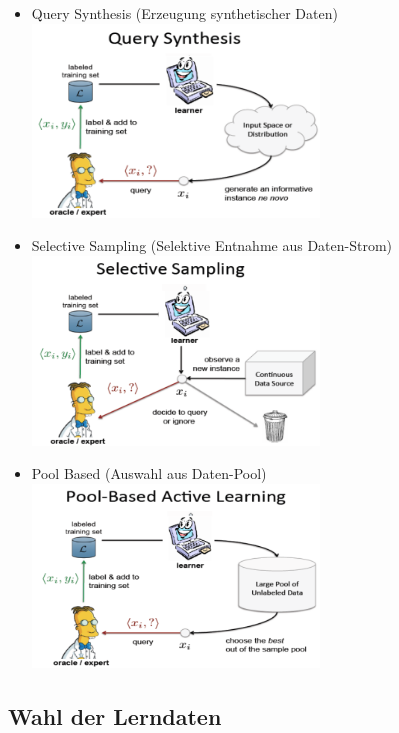 \documentclass[paper=a4, fontsize=11pt]{scrartcl} %
\numberwithin{equation}{section} %
\numberwithin{figure}{section} %
\numberwithin{table}{section} %
\begin{document}
\begin{itemize}
\item Query Synthesis (Erzeugung synthetischer Daten) \\ \includegraphics[width=0.6\textwidth]{imgs/qsyn}
\item Selective Sampling (Selektive Entnahme aus Daten-Strom) \\ \includegraphics[width=0.6\textwidth]{imgs/ssam}
\item Pool Based (Auswahl aus Daten-Pool) \\ \includegraphics[width=0.6\textwidth]{imgs/pbas}
\end{itemize}

\subsection{Wahl der Lerndaten}
\end{document}

